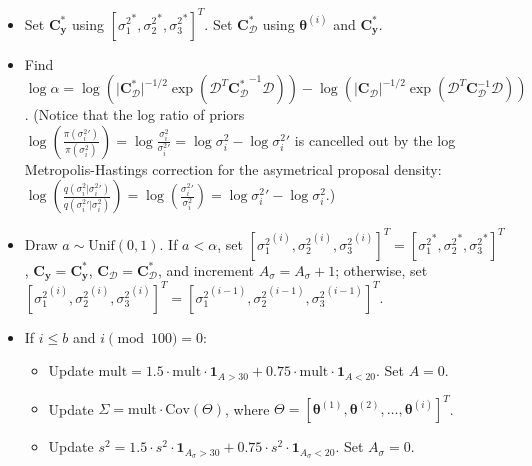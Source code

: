 \documentclass{article}
\begin{document}
\begin{appendices}
\begin{algorithm}
\begin{itemize}
\item Set $\mathbf C_{\mathbf y}^*$ using $\left[{\sigma^2_1}^*,{\sigma^2_2}^*,{\sigma^2_3}^*\right]^T$. Set $\mathbf C_{\mathcal D}^*$ using $\boldsymbol \theta^{(i)}$ and $\mathbf C_{\mathbf y}^*$.
\item Find $\log \alpha = \log \left( \lvert \mathbf C^*_{\mathcal D}\rvert^{-1/2} \exp(\mathcal D^T \mathbf {C_{\mathcal D}^*}^{-1}\mathcal D) \right) - \log \left( \lvert \mathbf C_{\mathcal D}\rvert^{-1/2} \exp(\mathcal D^T \mathbf C_{\mathcal D}^{-1}\mathcal D) \right)$. 
(Notice that the log ratio of priors $\log \left( \frac{\pi({\sigma^2_i}')}{\pi(\sigma^2_i)}\right)=\log \frac{{\sigma^2_i}}{{\sigma^2_i}'} = \log{\sigma^2_i}-\log{\sigma^2_i}'$ is cancelled out by the log Metropolis-Hastings correction for the asymetrical proposal density: $\log \left ( \frac{q(\sigma^2_i|{\sigma^2_i}')}{q({\sigma^2_i}'|\sigma^2_i)} \right)= \log\left( \frac{{\sigma^2_i}'}{\sigma^2_i} \right)= \log {\sigma^2_i}'- \log \sigma^2_i $.)
\item Draw $a\sim \mathrm{Unif}(0,1)$. If $a<\alpha$, set $\left[{\sigma_1^2}^{(i)}, {\sigma_2^2}^{(i)}, {\sigma_3^2}^{(i)} \right]^T = \left[{\sigma_1^2}^{*}, {\sigma_2^2}^{*}, {\sigma_3^2}^{*} \right]^T$, $\mathbf C_{\mathbf y} = \mathbf C_{\mathbf y}^*$, $\mathbf C_{\mathcal D} = \mathbf C_{\mathcal D}^*$, and increment $A_\sigma = A_\sigma + 1$; otherwise, set $\left[{\sigma_1^2}^{(i)}, {\sigma_2^2}^{(i)}, {\sigma_3^2}^{(i)} \right]^T = \left[{\sigma_1^2}^{(i-1)}, {\sigma_2^2}^{(i-1)}, {\sigma_3^2}^{(i-1)} \right]^T$.
\item If $i\leq b$ and $i\pmod {100} = 0$:
\renewcommand{\labelitemii}{$\circ$}
\begin{itemize}
\item Update $\mathrm {mult} = 1.5 \cdot \mathrm{mult} \cdot \mathbf 1_{A>30} + 0.75 \cdot \mathrm {mult} \cdot \mathbf 1_{A<20}$. Set $A=0$.
\item Update $\Sigma= \mathrm{mult} \cdot \mathrm {Cov}\left(\Theta\right)$, where $\Theta=\left[ {\boldsymbol\theta^{(1)}}, {\boldsymbol\theta^{(2)}}, \ldots, {\boldsymbol\theta^{(i)}} \right]^T$.
\item Update $s^2 = 1.5 \cdot s^2 \cdot \mathbf 1_{A_\sigma>30} + 0.75 \cdot s^2 \cdot \mathbf 1_{A_\sigma<20}$. Set $A_\sigma=0$.
\end{itemize}
\end{itemize}
    \caption{}
\end{algorithm}




\end{appendices}




\pagebreak


\end{document}
